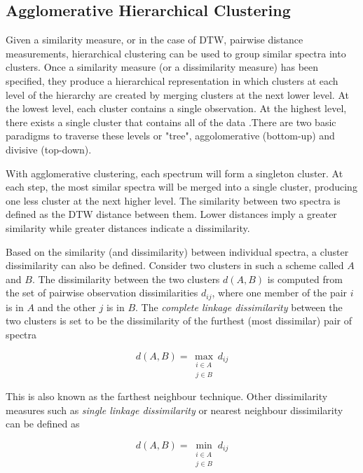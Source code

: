 \subsection{Agglomerative Hierarchical Clustering}

Given a similarity measure, or in the case of DTW, pairwise distance measurements, hierarchical clustering can be used to group similar spectra into clusters. Once a similarity measure (or a dissimilarity measure) has been specified, they produce a hierarchical representation in which clusters at each level of the hierarchy are created by merging clusters at the next lower level. At the lowest level, each cluster contains a single observation. At the highest level, there exists a single cluster that contains all of the data \cite{hastie2009elements}.There are two basic paradigms to traverse these levels or "tree", aggolomerative (bottom-up) and divisive (top-down). 

With agglomerative clustering, each spectrum will form a singleton cluster. At each step, the most similar spectra will be merged into a single cluster, producing one less cluster at the next higher level. The similarity between two spectra is defined as the DTW distance between them. Lower distances imply a greater similarity while greater distances indicate a dissimilarity. 

Based on the similarity (and dissimilarity) between individual spectra, a cluster dissimilarity can also be defined. Consider two clusters in such a scheme called $A$ and $B$. The dissimilarity between the two clusters $d(A,B)$ is computed from the set of pairwise observation dissimilarities $d_{ij}$, where one member of the pair $i$ is in $A$ and the other $j$ is in $B$. The \emph{complete linkage dissimilarity} between the two clusters is set to be the dissimilarity of the furthest (most dissimilar) pair of spectra

\begin{equation}
    d(A,B) = \max_{\substack{i \in A \\ j \in B}} d_{ij}
\end{equation}

This is also known as the farthest neighbour technique. Other dissimilarity measures such as \emph{single linkage dissimilarity} or nearest neighbour dissimilarity can be defined as

\begin{equation}
    d(A,B) = \min_{\substack{i \in A \\ j \in B}} d_{ij}
\end{equation}

